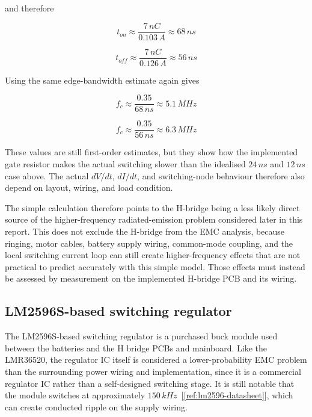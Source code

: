 and therefore

\begin{equation}
t_{on} \approx \frac{7\,nC}{0.103\,A} \approx 68\,ns
\end{equation}

\begin{equation}
t_{off} \approx \frac{7\,nC}{0.126\,A} \approx 56\,ns
\end{equation}

Using the same edge-bandwidth estimate again gives

\begin{equation}
f_c \approx \frac{0.35}{68\,ns} \approx 5.1\,MHz
\end{equation}

\begin{equation}
f_c \approx \frac{0.35}{56\,ns} \approx 6.3\,MHz
\end{equation}

These values are still first-order estimates, but they show how the implemented gate
resistor makes the actual switching slower than the idealised \(24\,ns\) and \(12\,ns\)
case above. The actual \(dV/dt\), \(dI/dt\), and switching-node behaviour therefore also
depend on layout, wiring, and load condition.

The simple calculation therefore points to the H-bridge being a less likely direct source
of the higher-frequency radiated-emission problem considered later in this report. This
does not exclude the H-bridge from the EMC analysis, because ringing, motor cables, battery supply wiring,
common-mode coupling, and the local switching current loop can still create higher-frequency
effects that are not practical to predict accurately with this simple model. Those effects
must instead be assessed by measurement on the implemented H-bridge PCB and its wiring.
\subsection{LM2596S-based switching regulator}
The LM2596S-based switching regulator is a purchased buck module used between the
batteries and the H bridge PCBs and mainboard. Like the LMR36520, the regulator IC
itself is considered a lower-probability EMC problem than the surrounding power wiring
and implementation, since it is a commercial regulator IC rather than a self-designed
switching stage. It is still notable that the module switches at approximately \(150\,kHz\)~[\ref{ref:lm2596-datasheet}],
which can create conducted ripple on the supply wiring.

